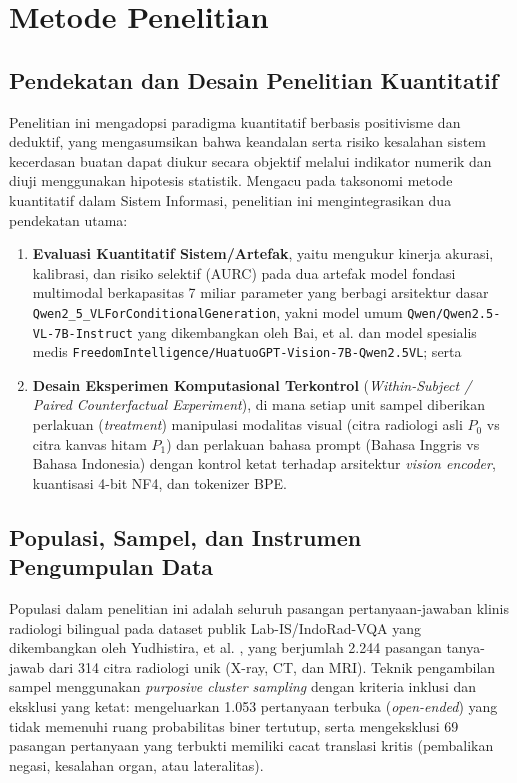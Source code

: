 \documentclass[a4paper,10pt,twoside]{article}
\begin{document}
\section{Metode Penelitian}

\subsection{Pendekatan dan Desain Penelitian Kuantitatif}
Penelitian ini mengadopsi paradigma kuantitatif berbasis positivisme dan deduktif, yang mengasumsikan bahwa keandalan serta risiko kesalahan sistem kecerdasan buatan dapat diukur secara objektif melalui indikator numerik dan diuji menggunakan hipotesis statistik. Mengacu pada taksonomi metode kuantitatif dalam Sistem Informasi, penelitian ini mengintegrasikan dua pendekatan utama:
\begin{enumerate}[label=(\arabic*),leftmargin=*]
    \item \textbf{Evaluasi Kuantitatif Sistem/Artefak}, yaitu mengukur kinerja akurasi, kalibrasi, dan risiko selektif (AURC) pada dua artefak model fondasi multimodal berkapasitas 7 miliar parameter yang berbagi arsitektur dasar \texttt{Qwen2\_5\_VLForConditionalGeneration}, yakni model umum \texttt{Qwen/Qwen2.5-VL-7B-Instruct} yang dikembangkan oleh Bai, et al. \cite{bai2025qwen2} dan model spesialis medis \texttt{FreedomIntelligence/HuatuoGPT-Vision-7B-Qwen2.5VL}; serta
    \item \textbf{Desain Eksperimen Komputasional Terkontrol} (\textit{Within-Subject / Paired Counterfactual Experiment}), di mana setiap unit sampel diberikan perlakuan (\textit{treatment}) manipulasi modalitas visual (citra radiologi asli $P_0$ vs citra kanvas hitam $P_1$) dan perlakuan bahasa prompt (Bahasa Inggris vs Bahasa Indonesia) dengan kontrol ketat terhadap arsitektur \textit{vision encoder}, kuantisasi 4-bit NF4, dan tokenizer BPE.
\end{enumerate}

\subsection{Populasi, Sampel, dan Instrumen Pengumpulan Data}
Populasi dalam penelitian ini adalah seluruh pasangan pertanyaan-jawaban klinis radiologi bilingual pada dataset publik Lab-IS/IndoRad-VQA yang dikembangkan oleh Yudhistira, et al. \cite{yudhistira2026does}, yang berjumlah 2.244 pasangan tanya-jawab dari 314 citra radiologi unik (X-ray, CT, dan MRI). Teknik pengambilan sampel menggunakan \textit{purposive cluster sampling} dengan kriteria inklusi dan eksklusi yang ketat: mengeluarkan 1.053 pertanyaan terbuka (\textit{open-ended}) yang tidak memenuhi ruang probabilitas biner tertutup, serta mengeksklusi 69 pasangan pertanyaan yang terbukti memiliki cacat translasi kritis (pembalikan negasi, kesalahan organ, atau lateralitas).
\end{document}

